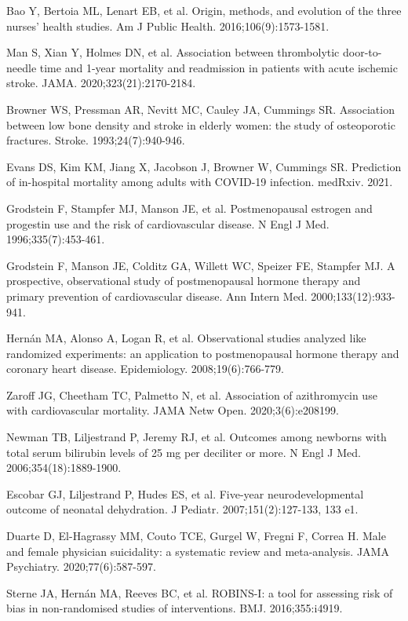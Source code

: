 \begin{references}
\item Bao Y, Bertoia ML, Lenart EB, et al. Origin, methods, and evolution of the three nurses’ health studies. Am J Public Health. 2016;106(9):1573-1581.
\item Man S, Xian Y, Holmes DN, et al. Association between thrombolytic door-to-needle time and 1-year mortality and readmission in patients with acute ischemic stroke. JAMA. 2020;323(21):2170-2184.
\item Browner WS, Pressman AR, Nevitt MC, Cauley JA, Cummings SR. Association between low bone density and stroke in elderly women: the study of osteoporotic fractures. Stroke. 1993;24(7):940-946.
\item Evans DS, Kim KM, Jiang X, Jacobson J, Browner W, Cummings SR. Prediction of in-hospital mortality among adults with COVID-19 infection. medRxiv. 2021.
\item Grodstein F, Stampfer MJ, Manson JE, et al. Postmenopausal estrogen and progestin use and the risk of cardiovascular disease. N Engl J Med. 1996;335(7):453-461.
\item Grodstein F, Manson JE, Colditz GA, Willett WC, Speizer FE, Stampfer MJ. A prospective, observational study of postmenopausal hormone therapy and primary prevention of cardiovascular disease. Ann Intern Med. 2000;133(12):933-941.
\item Hernán MA, Alonso A, Logan R, et al. Observational studies analyzed like randomized experiments: an application to postmenopausal hormone therapy and coronary heart disease. Epidemiology. 2008;19(6):766-779.
\item Zaroff JG, Cheetham TC, Palmetto N, et al. Association of azithromycin use with cardiovascular mortality. JAMA Netw Open. 2020;3(6):e208199.
\item Newman TB, Liljestrand P, Jeremy RJ, et al. Outcomes among newborns with total serum bilirubin levels of 25 mg per deciliter or more. N Engl J Med. 2006;354(18):1889-1900.
\item Escobar GJ, Liljestrand P, Hudes ES, et al. Five-year neurodevelopmental outcome of neonatal dehydration. J Pediatr. 2007;151(2):127-133, 133 e1.
\item Duarte D, El-Hagrassy MM, Couto TCE, Gurgel W, Fregni F, Correa H. Male and female physician suicidality: a systematic review and meta-analysis. JAMA Psychiatry. 2020;77(6):587-597.
\item Sterne JA, Hernán MA, Reeves BC, et al. ROBINS-I: a tool for assessing risk of bias in non-randomised studies of interventions. BMJ. 2016;355:i4919.

\end{references}
